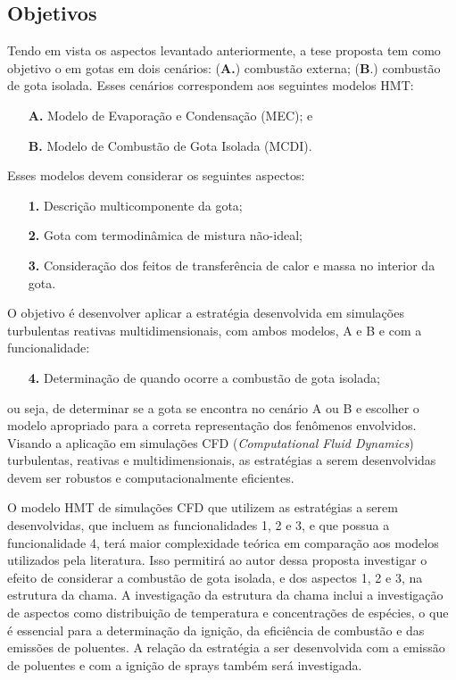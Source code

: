\subsection{Objetivos} \label{sec:objetivos}

Tendo em vista os aspectos levantado anteriormente, a tese proposta tem como objetivo o  em gotas em dois cenários: (\textbf{A.}) combustão externa; (\textbf{B}.) combustão de gota isolada.
Esses cenários correspondem aos seguintes modelos HMT:
\begin{enumerate}
    \item[\textbf{A.}] Modelo de Evaporação e Condensação (MEC); e 
    \item[\textbf{B.}] Modelo de Combustão de Gota Isolada (MCDI).
\end{enumerate}
Esses modelos devem considerar os seguintes aspectos: 
\begin{enumerate}
    \item[\textbf{1.}] Descrição multicomponente da gota; 
    \item[\textbf{2.}] Gota com termodinâmica de mistura não-ideal; 
    \item[\textbf{3.}] Consideração dos feitos de transferência	de calor e massa no interior da gota. 
\end{enumerate}
O objetivo é desenvolver aplicar a estratégia desenvolvida em simulações turbulentas reativas multidimensionais, com ambos modelos, {A} e {B} e com a funcionalidade:
\begin{enumerate}
    \item[\textbf{4.}] Determinação de quando ocorre a combustão de gota isolada;
\end{enumerate}
ou seja, de determinar se a gota se encontra no cenário {A} ou {B} e escolher o modelo apropriado para a correta representação dos fenômenos envolvidos.
Visando a aplicação em simulações CFD (\emph{Computational Fluid Dynamics}) turbulentas, reativas e multidimensionais, as estratégias a serem desenvolvidas devem ser robustos e computacionalmente eficientes.

O modelo HMT de simulações CFD que utilizem as estratégias a serem desenvolvidas, que incluem as funcionalidades {1}, {2} e {3}, e que possua a funcionalidade {4}, terá maior complexidade teórica em comparação aos modelos utilizados pela literatura. 
Isso permitirá ao autor dessa proposta investigar o efeito de considerar a combustão de gota isolada, e dos aspectos {1}, {2} e {3}, na estrutura da chama.
A investigação da estrutura da chama inclui a investigação de aspectos como distribuição de temperatura e concentrações de espécies, o que é essencial para a determinação da ignição, da eficiência de combustão e das emissões de poluentes.
A relação da estratégia a ser desenvolvida com a emissão de poluentes e com a ignição de sprays também será investigada. 





